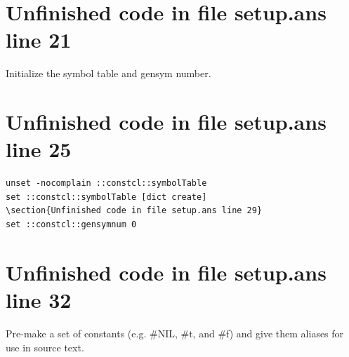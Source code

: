 \documentclass[twoside,9pt]{report}
\begin{document}
\section{Unfinished code in file setup.ans line 21}


Initialize the symbol table and gensym number.

\section{Unfinished code in file setup.ans line 25}
\begin{lstlisting}
unset -nocomplain ::constcl::symbolTable
set ::constcl::symbolTable [dict create]
\section{Unfinished code in file setup.ans line 29}
set ::constcl::gensymnum 0
\end{lstlisting}
\section{Unfinished code in file setup.ans line 32}


Pre-make a set of constants (e.g. \#NIL, \#t, and \#f) and give them aliases for use in source text.
\end{document}
